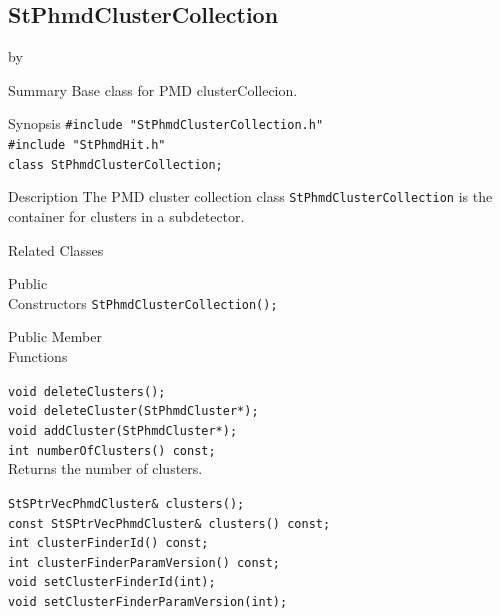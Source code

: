 \documentclass[twoside]{article}
\newcommand{\entrylabel}[1]{\mbox{\textbf{{#1}}}\hfil}%
\newenvironment{entry}
{\begin{list}{}%
    {\renewcommand{\makelabel}{\entrylabel}%
     \setlength{\labelwidth}{90pt}%
     \setlength{\leftmargin}{\labelwidth}
     \advance\leftmargin by \labelsep%
      }%
    }%
  {\end{list}}
\newcommand{\Entrylabel}[1]%
{\raisebox{0pt}[1ex][0pt]{\makebox[\labelwidth][l]%
    {\parbox[t]{\labelwidth}{\hspace{0pt}\textbf{{#1}}}}}}
\newenvironment{Entry}%
{\renewcommand{\entrylabel}{\Entrylabel}\begin{entry}}%
  {\end{entry}}
\begin{document}
\subsection{StPhmdClusterCollection}
\label{sec:StPhmdClusterCollection}
\begin{Entry}
\item[Summary] Base class for PMD clusterCollecion. 

\item[Synopsis]
    \verb+#include "StPhmdClusterCollection.h"+\\
    \verb+#include "StPhmdHit.h"+\\
    \verb+class StPhmdClusterCollection;+\\
\item[Description]
The PMD cluster collection class \texttt{StPhmdClusterCollection} is the container for clusters in a subdetector.

\item[Related Classes]
\item[Public\\ Constructors]
    \verb+StPhmdClusterCollection();+\\
\item[Public Member\\ Functions]

    \verb+void deleteClusters();+\\
    \verb+void deleteCluster(StPhmdCluster*);+\\
    \verb+void addCluster(StPhmdCluster*);+\\   
    \verb+int numberOfClusters() const;+\\
     Returns the number of clusters.    

    \verb+StSPtrVecPhmdCluster& clusters();+\\
    \verb+const StSPtrVecPhmdCluster& clusters() const;+\\
    \verb+int clusterFinderId() const;+\\
    \verb+int clusterFinderParamVersion() const;+\\
    \verb+void setClusterFinderId(int);+\\
    \verb+void setClusterFinderParamVersion(int);+\\
\end{Entry}
\clearpage
\end{document}

